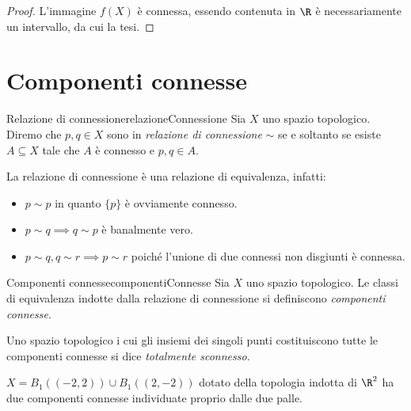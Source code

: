 \begin{proof}
	L'immagine \(f(X)\) è connessa, essendo contenuta in \(\R\) è necessariamente un intervallo, da cui la tesi.
\end{proof}
%
%
\section{Componenti connesse}

\begin{defn}{Relazione di connessione}{relazioneConnessione}
	Sia \(X\) uno spazio topologico.
	Diremo che \(p,q\in X\) sono in \emph{relazione di connessione} \(\sim\) se e soltanto se esiste \(A\subseteq X\) tale che \(A\) è connesso e \(p,q\in A\).
\end{defn}

\begin{oss}
	La relazione di connessione è una relazione di equivalenza, infatti:
	\begin{itemize}
		\item \(p\sim p\) in quanto \(\{p\}\) è ovviamente connesso.
		\item \(p\sim q\implies q\sim p\) è banalmente vero.
		\item \(p\sim q, q\sim r \implies p\sim r\) poiché l'unione di due connessi non disgiunti è connessa.
	\end{itemize}
\end{oss}

\begin{defn}{Componenti connesse}{componentiConnesse}
	Sia \(X\) uno spazio topologico.
	Le classi di equivalenza indotte dalla relazione di connessione si definiscono \emph{componenti connesse}.
\end{defn}

\begin{notz}
	Uno spazio topologico i cui gli insiemi dei singoli punti costituiscono tutte le componenti connesse si dice \emph{totalmente sconnesso}.
\end{notz}

\begin{ese}
	\(X=B_1((-2,2))\cup B_1((2,-2))\) dotato della topologia indotta di \(\R^2\) ha due componenti connesse individuate proprio dalle due palle.
\end{ese}

